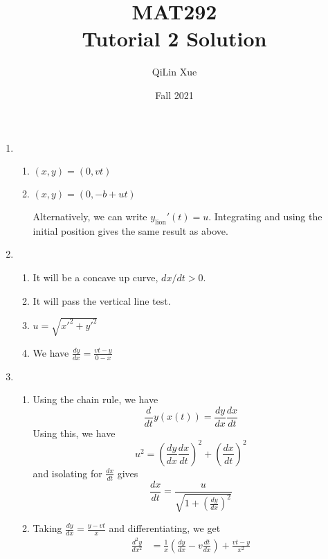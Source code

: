 \documentclass{article}
\title{MAT292 \\ Tutorial 2 Solution}
\author{QiLin Xue}
\date{Fall 2021}
\begin{document}
\newcommand{\tabitem}{~~\llap{\textbullet}~~}

\maketitle
\begin{enumerate}
    \item \begin{enumerate}
        \item $(x,y) = (0, vt)$
        \item $(x,y) = (0,-b + ut)$
        
        Alternatively, we can write $y_\text{lion}'(t) = u$. Integrating and using the initial position gives the same result as above.
    \end{enumerate}
    \item \begin{enumerate}
        \item It will be a concave up curve, $dx/dt > 0.$
        \item It will pass the vertical line test.
        \item $u=\sqrt{x'^2+y'^2}$
        \item We have $\frac{dy}{dx} = \frac{vt-y}{0-x}$
    \end{enumerate}
    \item \begin{enumerate}
        \item Using the chain rule, we have 
        \begin{equation}
            \frac{d}{dt}y(x(t)) = \frac{dy}{dx} \frac{dx}{dt}
        \end{equation}
        Using this, we have
        \begin{equation}
            u^2 = \left(\frac{dy}{dx}\frac{dx}{dt}\right)^2+\left(\frac{dx}{dt}\right)^2
        \end{equation}
        and isolating for $\frac{dx}{dt}$ gives 
        \begin{equation}
            \boxed{\frac{dx}{dt} = \frac{u}{\sqrt{1+\left(\frac{dy}{dx}\right)^2}}}
        \end{equation}
        \item Taking $\frac{dy}{dx}=\frac{y-vt}{x}$ and differentiating, we get
        \begin{align}
            \frac{d^2y}{dx^2} &= \frac{1}{x}\left(\frac{dy}{dx}-v\frac{dt}{dx}\right) + \frac{vt-y}{x^2} \\ 

\end{align}
\end{enumerate}
\end{enumerate}
\end{document}
